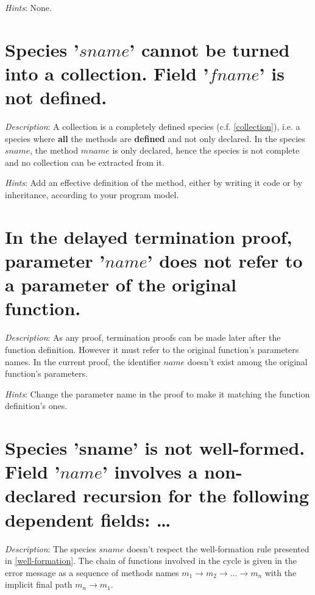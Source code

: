 {\em Hints}: None.



\section*{Species '$sname$' cannot be turned into a collection. Field
  '$fname$' is not defined.}

{\em Description}: A collection is a completely defined species
(c.f. \ref{collection}), i.e. a species where {\bf all} the methods
are {\bf defined} and not only declared. In the species $sname$, the
method $mname$ is only declared, hence the species is not complete and
no collection can be extracted from it.

{\em Hints}: Add an effective definition of the method, either by
writing it code or by inheritance, according to your program model.



\section*{In the delayed termination proof, parameter '$name$' does
  not refer to a parameter of the original function.}

{\em Description}: As any proof, termination proofs can be made later
after the function definition. However it must refer to the original
function's parameters names. In the current proof, the identifier
$name$ doesn't exist among the original function's parameters.

{\em Hints}: Change the parameter name in the proof to make it
matching the function definition's ones.



\section*{Species 'sname' is not well-formed. Field '$name$' involves
  a non-declared recursion for the following dependent fields: \ldots}

{\em Description}: The species $sname$ doesn't respect the
well-formation rule presented in \ref{well-formation}. The chain of
functions involved in the cycle is given in the error message as a
sequence of methods names
$m_1 \rightarrow m_2 \rightarrow \ldots \rightarrow m_n$ with the
implicit final path $m_n \rightarrow m_1$.

